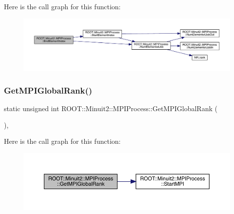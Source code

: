 Here is the call graph for this function\+:
\nopagebreak
\begin{figure}[H]
\begin{center}
\leavevmode
\includegraphics[width=350pt]{dc/d43/classROOT_1_1Minuit2_1_1MPIProcess_af4445148831dec4961d5f8aa99aeb2c1_cgraph}
\end{center}
\end{figure}
\mbox{\label{classROOT_1_1Minuit2_1_1MPIProcess_aa7c524a7980698bf9bba3a652e2f9a13}} 
\subsubsection{\texorpdfstring{GetMPIGlobalRank()}{GetMPIGlobalRank()}\hspace{0.1cm}{\footnotesize\ttfamily [1/3]}}
{\footnotesize\ttfamily static unsigned int R\+O\+O\+T\+::\+Minuit2\+::\+M\+P\+I\+Process\+::\+Get\+M\+P\+I\+Global\+Rank (\begin{DoxyParamCaption}{ }\end{DoxyParamCaption})\hspace{0.3cm}{\ttfamily [inline]}, {\ttfamily [static]}}

Here is the call graph for this function\+:
\nopagebreak
\begin{figure}[H]
\begin{center}
\leavevmode
\includegraphics[width=350pt]{dc/d43/classROOT_1_1Minuit2_1_1MPIProcess_aa7c524a7980698bf9bba3a652e2f9a13_cgraph}
\end{center}
\end{figure}
\mbox{\label{classROOT_1_1Minuit2_1_1MPIProcess_aa7c524a7980698bf9bba3a652e2f9a13}} 

